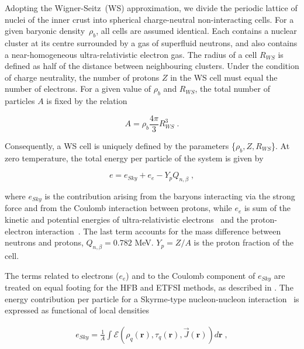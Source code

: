 \documentclass[
    amsmath,amssymb,
    aps,
    prc,
    floatfix,
]{revtex4-2}
\begin{document}
Adopting the Wigner-Seitz~(WS) approximation, we divide the periodic lattice of nuclei of the inner crust into spherical charge-neutral non-interacting cells. For a given baryonic density~$\rho_b$, all cells are assumed identical. Each contains a nuclear cluster at its centre surrounded by a gas of superfluid neutrons, and also contains a near-homogeneous ultra-relativistic electron gas.
The radius of a cell $R_{WS}$ is defined as half of the distance between neighbouring clusters. Under the condition of charge neutrality, the number of protons $Z$ in the WS cell must equal the number of electrons. For a given value of $\rho_b$ and $R_{WS}$, the total number of particles $A$ is fixed by the relation

    \begin{equation}\label{eqn:tot_particles}
        A=\rho_b \frac{4\pi}{3}R_{WS}^3\;.
    \end{equation}

\noindent Consequently, a WS cell is uniquely defined by the parameters \{$\rho_b,Z,R_{WS}$\}. At zero temperature, the total energy per particle of the system is given by

    \begin{equation}\label{eqn:etot}
        e = e_{Sky} + e_e - Y_p Q_{n,\beta}\;,
    \end{equation}

\noindent where $e_{Sky}$ is the contribution arising from the baryons interacting via the strong force and from the Coulomb interaction between protons, while $e_e$ is sum of the kinetic and potential energies of ultra-relativistic electrons~\cite{shapiro2008black} and the proton-electron interaction~\cite{grill2011cluster}. The last term accounts for the mass difference between neutrons and protons, $Q_{n,\beta}=0.782$ MeV. $Y_p=Z/A$ is the proton fraction of the cell.

The terms related to electrons ($e_e$) and to the Coulomb component of $e_{Sky}$ are treated on equal footing for the HFB and ETFSI methods, as described in \cite{pearsonInnerCrustNeutron2012}. The  energy contribution per particle for a Skyrme-type nucleon-nucleon interaction~\cite{skyrme1956cvii} is expressed as functional of local densities

    \begin{eqnarray}
        e_{Sky}=\frac{1}{A}\int \mathcal{E}\left(\rho_q(\mathbf{r}),\tau_q(\mathbf{r}),\vec{J}(\mathbf{r}) \right)d\mathbf{r}\;,
    \end{eqnarray}
\end{document}
